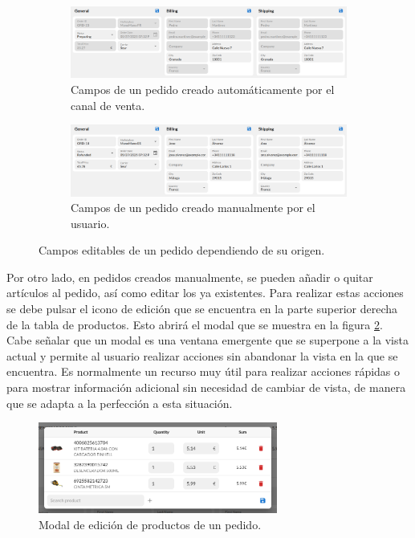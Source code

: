 \begin{figure}[H]
    \centering
    \begin{subfigure}{\linewidth}
        \centering
        \includegraphics[width=0.8\linewidth]{figures/design_develop/screenshots/campos_bloqueados.png}
        \caption{Campos de un pedido creado automáticamente por el canal de venta.}
    \end{subfigure}
    \par\vspace{0.6cm}
    \begin{subfigure}{\linewidth}
        \centering
        \includegraphics[width=0.8\linewidth]{figures/design_develop/screenshots/campos_no_bloqueados.png}
        \caption{Campos de un pedido creado manualmente por el usuario.}
    \end{subfigure}
    \par\vspace{0.3cm}
    \caption{Campos editables de un pedido dependiendo de su origen.}
    \label{fig:dev:ss:campos_editables_pedido}
\end{figure}

Por otro lado, en pedidos creados manualmente, se pueden añadir o quitar artículos al pedido, así como editar los ya existentes. Para realizar estas acciones se debe pulsar el icono de edición que se encuentra en la parte superior derecha de la tabla de productos. Esto abrirá el modal que se muestra en la figura \ref{fig:dev:ss:modal_edicion_productos_pedido}. Cabe señalar que un modal es una ventana emergente que se superpone a la vista actual y permite al usuario realizar acciones sin abandonar la vista en la que se encuentra. Es normalmente un recurso muy útil para realizar acciones rápidas o para mostrar información adicional sin necesidad de cambiar de vista, de manera que se adapta a la perfección a esta situación.

\begin{figure}[H]
    \centering
    \includegraphics[width=0.7\textwidth]{figures/design_develop/screenshots/modal_edicion_productos_pedido.png}
    \caption{Modal de edición de productos de un pedido.}
    \label{fig:dev:ss:modal_edicion_productos_pedido}
\end{figure}

